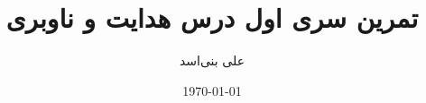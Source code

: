 \documentclass[12pt,onecolumn,a4paper]{article}
\begin{document}
	\title{تمرین سری اول درس هدایت و ناوبری} 
	\author{علی بنی‌اسد}
	\date{\today}
	\maketitle
	
	
	
	
	
	
	\newpage
	\tableofcontents
	\newpage
	\listoffigures
	\newpage
	\listoftables
\end{document}
